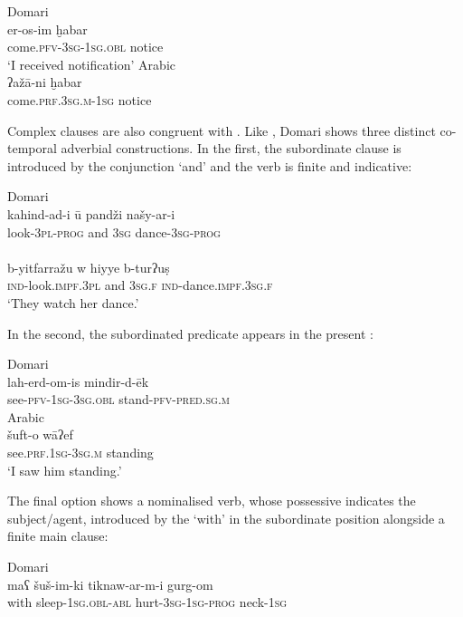 \documentclass[output=paper]{langsci/langscibook}
\begin{document}
\ea
\begin{multicols}{2}\raggedcolumns\ea
{Domari}\\
\gll er-os-im ḫabar    \\
     come.\textsc{pfv-3sg-1sg.obl}  notice\\
     \glt ‘I received notification’\columnbreak
\ex
{Arabic}\\
\gll  ʔažā-ni  ḫabar  \\
     come.\textsc{prf.3sg.m-1sg} notice\\
\z\end{multicols}
\z

Complex clauses are also congruent with . Like , Domari shows three distinct co-temporal adverbial constructions. In the first, the subordinate clause is introduced by the conjunction ‘and’ and the verb is finite and indicative:

\ea
\ea
{Domari}\\
\gll kahind-ad-i ū pandži našy-ar-i  \\
     look-\textsc{3pl-prog} and \textsc{3sg} dance-\textsc{3sg-prog}\\
     
\\
\gll b-yitfarražu w hiyye b-turʔuṣ  \\
     \textsc{ind}-look.\textsc{impf.3pl} and \textsc{3sg.f} \textsc{ind}-dance.\textsc{impf.3sg.f}\\
\glt ‘They watch her dance.’
\z
\z

In the second, the subordinated predicate appears in the present :

\ea
\ea
{Domari}\\
\gll lah-erd-om-is mindir-d-ēk    \\
       see-\textsc{pfv-1sg-3sg.obl} stand-\textsc{pfv-pred.sg.m}\\
 
\ex
{Arabic}\\
\gll šuft-o   wāʔef    \\
     see.\textsc{prf.1sg-3sg.m} standing\\
\glt ‘I saw him standing.’
\z
\z

The final option shows a nominalised verb, whose possessive  indicates the subject/agent, introduced by the  ‘with’ in the subordinate position alongside a finite main clause:

\ea
\ea
{Domari}\\
\gll maʕ šuš-im-ki tiknaw-ar-m-i gurg-om  \\
       with sleep-\textsc{1sg.obl-abl} hurt-\textsc{3sg-1sg-prog} neck-1\textsc{sg}\\
\end{document}
